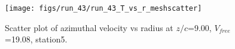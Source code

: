 \begin{figure}[H]
\centering
\texttt{[image: figs/run\_43/run\_43\_T\_vs\_r\_meshscatter]}
\caption{Scatter plot of azimuthal velocity vs radius at $z/c$=9.00, $V_{free}$=19.08, station5.}
\label{fig:run_43_T_vs_r_meshscatter}
\end{figure}


